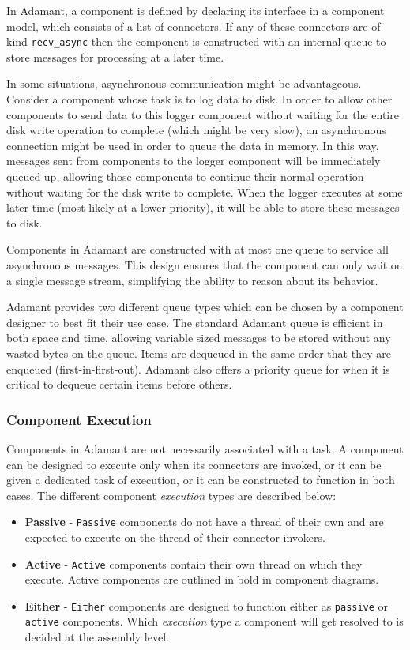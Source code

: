In Adamant, a component is defined by declaring its interface in a component model, which consists of a list of connectors. If any of these connectors are of kind \texttt{recv\_async} then the component is constructed with an internal queue to store messages for processing at a later time. 

In some situations, asynchronous communication might be advantageous. Consider a component whose task is to log data to disk. In order to allow other components to send data to this logger component without waiting for the entire disk write operation to complete (which might be very slow), an asynchronous connection might be used in order to queue the data in memory. In this way, messages sent from components to the logger component will be immediately queued up, allowing those components to continue their normal operation without waiting for the disk write to complete. When the logger executes at some later time (most likely at a lower priority), it will be able to store these messages to disk.

Components in Adamant are constructed with at most one queue to service all asynchronous messages. This design ensures that the component can only wait on a single message stream, simplifying the ability to reason about its behavior. 

Adamant provides two different queue types which can be chosen by a component designer to best fit their use case. The standard Adamant queue is efficient in both space and time, allowing variable sized messages to be stored without any wasted bytes on the queue. Items are dequeued in the same order that they are enqueued (first-in-first-out). Adamant also offers a priority queue for when it is critical to dequeue certain items before others.

\subsubsection{Component Execution}

Components in Adamant are not necessarily associated with a task. A component can be designed to execute only when its connectors are invoked, or it can be given a dedicated task of execution, or it can be constructed to function in both cases. The different component \textit{execution} types are described below:

\begin{itemize}
  \item \textbf{Passive} - \texttt{Passive} components do not have a thread of their own and are expected to execute on the thread of their connector invokers.
  \item \textbf{Active} - \texttt{Active} components contain their own thread on which they execute. Active components are outlined in bold in component diagrams.
  \item \textbf{Either} - \texttt{Either} components are designed to function either as \texttt{passive} or \texttt{active} components. Which \textit{execution} type a component will get resolved to is decided at the assembly level.
\end{itemize}

